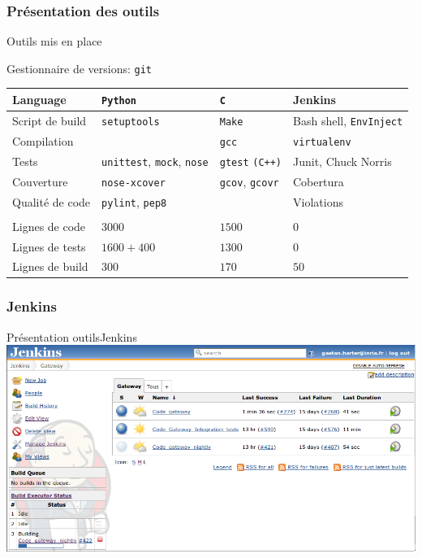 \documentclass[9pt]{beamer}
\begin{document}
\subsubsection{Présentation des outils}
\begin{frame}{Outils mis en place}

Gestionnaire de versions: \texttt{git}
\begin{tabular}{ l | l l l }
Language         & \texttt{Python}     & \texttt{C}    & Jenkins \\ \hline
Script de build  & \texttt{setuptools} & \texttt{Make} & Bash shell, \texttt{EnvInject}\\
Compilation      & ~                   & \texttt{gcc}  & \texttt{virtualenv} \\
Tests            & \texttt{unittest}, \texttt{mock}, \texttt{nose}
                                       & \texttt{gtest} \texttt{(C++)}
                                                       & Junit, Chuck Norris\\
Couverture       & \texttt{nose-xcover}
                                   & \texttt{gcov}, \texttt{gcovr}
                                                       & Cobertura \\
Qualité de code  & \texttt{pylint}, \texttt{pep8} & ~  & Violations \\
\\
Lignes de code   &  $3000$        &  $1500$  &  $0$  \\
Lignes de tests  &  $1600 + 400$  &  $1300$  &  $0$  \\
Lignes de build  &  $300$         &  $170$   &  $50$ \\

\end{tabular}
\end{frame}



\subsubsection{Jenkins}
\begin{frame}{Présentation outils}{Jenkins}
        \includegraphics[width=\linewidth]{images/jenkins}
\end{frame}
\end{document}
